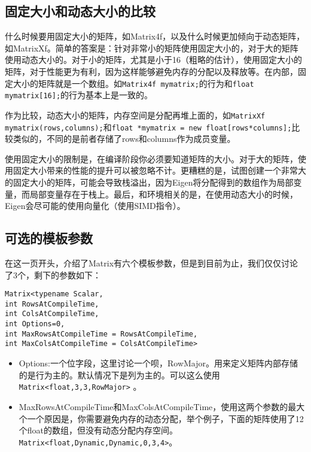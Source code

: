 \subsection{固定大小和动态大小的比较}

什么时候要用固定大小的矩阵，如Matrix4f，以及什么时候更加倾向于动态矩阵，如MatrixXf。简单的答案是：针对非常小的矩阵使用固定大小的，对于大的矩阵使用动态大小的。对于小的矩阵，尤其是小于16（粗略的估计），使用固定大小的矩阵，对于性能更为有利，因为这样能够避免内存的分配以及释放等。在内部，固定大小的矩阵就是一个数组。如\verb|Matrix4f mymatrix;|的行为和\verb|float mymatrix[16];|的行为基本上是一致的。

作为比较，动态大小的矩阵，内存空间是分配再堆上面的，如\verb|MatrixXf mymatrix(rows,columns);|和\verb|float *mymatrix = new float[rows*columns];|比较类似的，不同的是前者存储了rows和columns作为成员变量。

使用固定大小的限制是，在编译阶段你必须要知道矩阵的大小。对于大的矩阵，使用固定大小带来的性能的提升可以被忽略不计。更糟糕的是，试图创建一个非常大的固定大小的矩阵，可能会导致栈溢出，因为Eigen将分配得到的数组作为局部变量，而局部变量存在于栈上。最后，和环境相关的是，在使用动态大小的时候，Eigen会尽可能的使用向量化（使用SIMD指令）。

\subsection{可选的模板参数}
在这一页开头，介绍了Matrix有六个模板参数，但是到目前为止，我们仅仅讨论了3个，剩下的参数如下：
\begin{lstlisting}[style=Cpp]
Matrix<typename Scalar,
int RowsAtCompileTime,
int ColsAtCompileTime,
int Options=0,
int MaxRowsAtCompileTime = RowsAtCompileTime,
int MaxColsAtCompileTime = ColsAtCompileTime>
\end{lstlisting}
\begin{itemize}
\item Options:一个位字段，这里讨论一个呗，RowMajor。用来定义矩阵内部存储的是行为主的。默认情况下是列为主的。可以这么使用\verb|Matrix<float,3,3,RowMajor>| 。
\item MaxRowsAtCompileTime和MaxColsAtCompileTime，使用这两个参数的最大个一个原因是，你需要避免内存的动态分配，举个例子，下面的矩阵使用了12个float的数组，但没有动态分配内存空间。\verb|Matrix<float,Dynamic,Dynamic,0,3,4>|。
\end{itemize}

